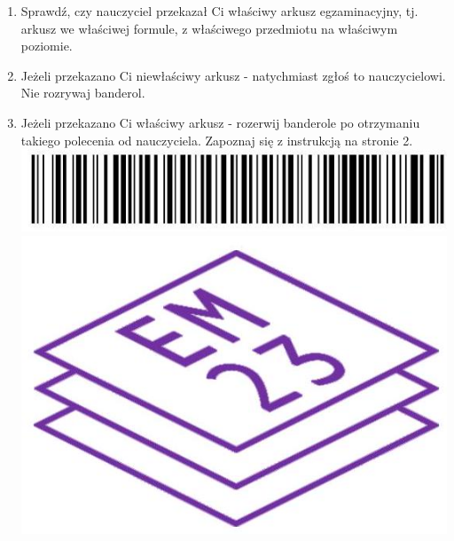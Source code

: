 \documentclass[10pt]{article}
\begin{document}
\begin{enumerate}
  \item Sprawdź, czy nauczyciel przekazał Ci właściwy arkusz egzaminacyjny, tj. arkusz we właściwej formule, z właściwego przedmiotu na właściwym poziomie.
  \item Jeżeli przekazano Ci niewłaściwy arkusz - natychmiast zgłoś to nauczycielowi. Nie rozrywaj banderol.
  \item Jeżeli przekazano Ci właściwy arkusz - rozerwij banderole po otrzymaniu takiego polecenia od nauczyciela. Zapoznaj się z instrukcją na stronie 2.\\
\includegraphics[max width=\textwidth, center]{2024_11_21_f1ecc00f5c4ab21f0d04g-01}\\
\includegraphics[max width=\textwidth, center]{2024_11_21_f1ecc00f5c4ab21f0d04g-02}
\end{enumerate}
\end{document}
